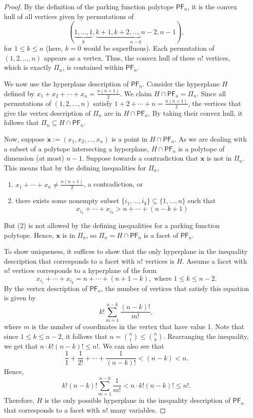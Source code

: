 \documentclass[11pt]{amsart}
\theoremstyle{definition}
\newcommand{\0}{\emptyset}
\newcommand{\bx}{\mathbf{x}}
\newcommand{\PF}{\mathsf{PF}}
\begin{document}
\begin{proof}
By the definition of the parking function polytope $\PF_n$, it is the convex hull of all vertices given by permutations of \[ (\underbrace{1, \ldots, 1}_k, \underbrace{k+1, k+2, \ldots, n-2, n-1}_{n-k}),\] for $1 \leq k \leq n$ (here, $k=0$ would be superfluous).
Each permutation of $(1,2,\ldots,n)$ appears as a vertex. 
Thus, the convex hull of these $n!$ vertices, which is exactly $\Pi_n$, is contained within $\PF_n$. 


We now use the hyperplane description of $\PF_n$.
Consider the hyperplane $H$ defined by $x_{1}+ x_{2}+ \cdots + x_{n} = \frac{n(n+1)}{2} $.
We claim  $H\cap \PF_n = \Pi_{n}$.
Since all permutations of $(1,2,\ldots, n)$ satisfy $1+2+\cdots+n = \frac{n(n+1)}{2}$, the vertices that give the vertex description of $\Pi_{n}$ are in $H \cap \PF_n$.
By taking their convex hull, it follows that $\Pi_n\subseteq H \cap \PF_n$.    

Now, suppose $\bx:=(x_1, x_2, \ldots, x_n)$ is a point in $H \cap \PF_n$.
As we are dealing with a subset of a polytope intersecting a hyperplane, $H \cap \PF_n$ is a polytope of dimension (at most) $n-1$. 
Suppose towards a contradiction that $\bx$ is not in $\Pi_{n}$. 
This means that by the defining inequalities for $\Pi_n$, 
\begin{enumerate}
    \item  $x_1 + \cdots + x_n \neq \frac{n(n+1)}{2}$, a contradiction, or
    \item there exists some nonempty subset $\{i_1, \ldots, i_k\} \subseteq \{1, \ldots, n\}$ such that 
    \[x_{i_1} + \cdots + x_{i_k} > n + \cdots + (n-k+1) %
    \]
\end{enumerate}
But (2) is not allowed by the defining inequalities for a parking function polytope. 
Hence, $\mathbf{x}$ is in $\Pi_n$, so $\Pi_n = H \cap \PF_n$ is a facet of $\PF_n$.


To show uniqueness, it suffices to show that the only hyperplane in the inequality description that corresponds to a facet with $n!$ vertices is $H$.
Assume a facet with $n!$ vertices corresponds to a hyperplane of the form \[x_{i_1}+\cdots + x_{i_k} = n + \cdots + (n+1-k), \text{ where } 1\leq k\leq n-2. \]
By the vertex description of $\PF_n$, the number of vertices that satisfy this equation is given by 
$$k! \sum_{m=1}^{n-k}\frac{(n-k)!}{m!},$$ 
where $m$ is the number of coordinates in the vertex that have value 1. 
Note that since $1\leq k \leq n-2$, it follows that $ n = \binom{n}{1} \leq \binom{n}{k}$.
Rearranging the inequality, we get that $n\cdot k!(n-k)!\leq n!$.
We can also see that $$\frac{1}{1}+\frac{1}{2!}+\cdots +\frac{1}{(n-k)!} < (n-k) < n.$$ 
Hence, $$k! (n-k)! \sum\limits_{m=1}^{n-k}\frac{1}{m!}< n\cdot k!(n-k)! \leq n!.$$
Therefore, $H$ is the only possible hyperplane in the inequality description of $\PF_n$ that corresponds to a facet with $n!$ many variables.
\end{proof}
\end{document}
